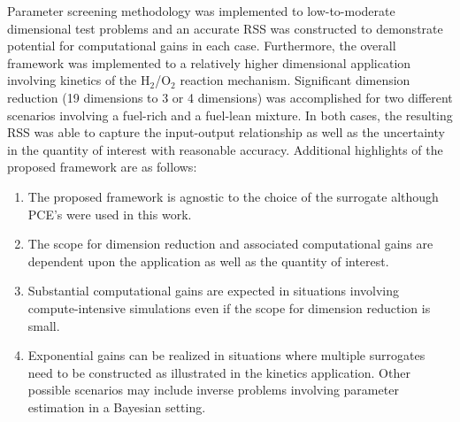 Parameter screening methodology was implemented to low-to-moderate dimensional
test problems and an accurate RSS was constructed to demonstrate potential for
computational gains in each case. Furthermore, the overall framework was
implemented  to a relatively higher dimensional application involving kinetics
of the H$_2$/O$_2$ reaction mechanism.  Significant dimension reduction (19 
dimensions to 3 or 4 dimensions) was
accomplished for two different scenarios involving a fuel-rich and a fuel-lean
mixture. In both cases, the resulting RSS was able to capture the input-output
relationship as well as the uncertainty in the quantity of interest with
reasonable accuracy. Additional highlights of the proposed framework are as
follows:
\begin{enumerate}
\item The proposed framework is agnostic to the choice of the surrogate although PCE's were used
in this work. 
\item The scope for dimension reduction and associated computational gains are
dependent upon the application as well as the quantity of interest. 
\item Substantial computational gains are expected in situations involving
compute-intensive simulations even if the scope for dimension reduction is
small. 

\item Exponential gains can be realized in situations where multiple surrogates need to be
constructed as illustrated in the kinetics application. Other possible scenarios may
include inverse problems involving parameter estimation in a Bayesian setting. 
\end{enumerate}

